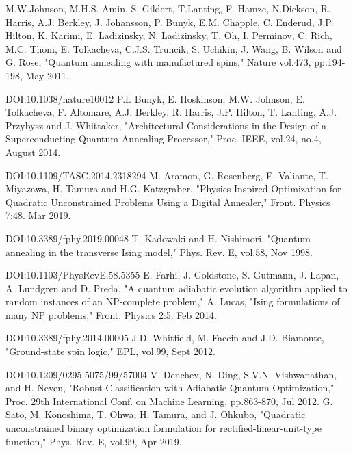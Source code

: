 \documentclass[technicalreport]{ieicej}
\begin{document}
  
%
%
\begin{thebibliography}{99}%
  M.W.Johnson, M.H.S. Amin, S. Gildert, T.Lanting, F. Hamze, N.Dickson, R. Harris, A.J. Berkley, J. Johansson, P. Bunyk, E.M. Chapple, C. Enderud, J.P. Hilton, K. Karimi, E. Ladizinsky, N. Ladizinsky, T. Oh, I. Perminov, C. Rich, M.C. Thom, E. Tolkacheva, C.J.S. Truncik, S. Uchikin, J. Wang, B. Wilson and G. Rose, "Quantum annealing with manufactured spins," Nature vol.473, pp.194-198, May 2011.
  
  DOI:10.1038/nature10012
  P.I. Bunyk, E. Hoskinson, M.W. Johnson, E. Tolkacheva, F. Altomare, A.J. Berkley, R. Harris, J.P. Hilton, T. Lanting, A.J. Przybysz and J. Whittaker, "Architectural Considerations in the Design of a Superconducting Quantum Annealing Processor," Proc. IEEE, vol.24, no.4, August 2014.
  
  DOI:10.1109/TASC.2014.2318294
  M. Aramon, G. Rosenberg, E. Valiante, T. Miyazawa, H. Tamura and H.G. Katzgraber, "Physics-Inspired Optimization for Quadratic Unconstrained Problems Using a Digital Annealer," Front. Physics 7:48. Mar 2019.
  
  DOI:10.3389/fphy.2019.00048
  T. Kadowaki and H. Nishimori, "Quantum annealing in the transverse Ising model," Phys. Rev. E, vol.58, Nov 1998.
  
  DOI:10.1103/PhysRevE.58.5355
  E. Farhi, J. Goldstone, S. Gutmann, J. Lapan, A. Lundgren and D. Preda, "A quantum adiabatic evolution algorithm applied to random instances of an NP-complete problem,"
  A. Lucas, "Ising formulations of many NP problems," Front. Physics 2:5. Feb 2014.
  
  DOI:10.3389/fphy.2014.00005
  J.D. Whitfield, M. Faccin and J.D. Biamonte, "Ground-state spin logic," EPL, vol.99, Sept 2012.
  
  DOI:10.1209/0295-5075/99/57004
  V. Denchev, N. Ding, S.V.N. Vishwanathan, and H. Neven, "Robust Classification with Adiabatic Quantum Optimization," Proc. 29th International Conf. on Machine Learning, pp.863-870, Jul 2012.
  G. Sato, M. Konoshima, T. Ohwa, H. Tamura, and J. Ohkubo, "Quadratic unconstrained binary optimization formulation for rectified-linear-unit-type function," Phys. Rev. E, vol.99, Apr 2019.
\end{thebibliography}
\end{document}
